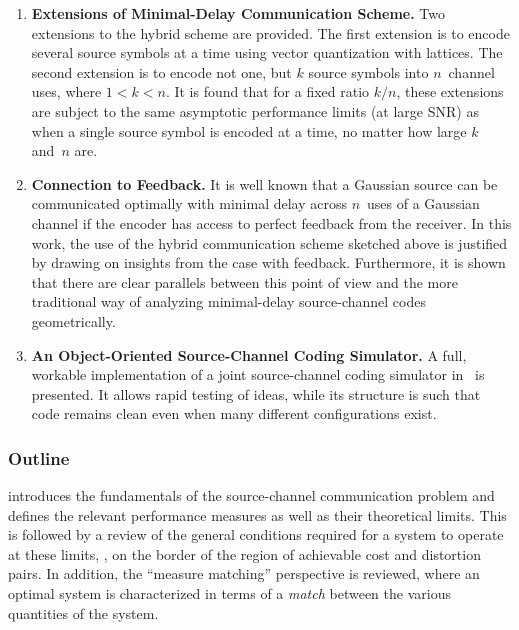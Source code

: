 \begin{enumerate}
  \item \textbf{Extensions of Minimal-Delay Communication Scheme.} Two
    extensions to the hybrid scheme are provided. The first extension is to
    encode several source symbols at a time using vector quantization with
    lattices. The second extension is to encode not one, but $k$ source symbols
    into $n$~channel uses, where $1 < k < n$. It is found that for a fixed ratio
    $k/n$, these extensions are subject to the same asymptotic performance
    limits (at large SNR) as when a single source symbol is encoded at a time,
    no matter how large $k$ and~$n$ are.

  \item \textbf{Connection to Feedback.} It is well known that a Gaussian source
    can be communicated optimally with minimal delay across $n$~uses of a
    Gaussian channel if the encoder has access to perfect feedback from the
    receiver. In this work,  the use of the hybrid communication scheme sketched
    above is justified by drawing on insights from the case with feedback.
    Furthermore, it is shown that there are clear parallels between this point
    of view and the more traditional way of analyzing minimal-delay
    source-channel codes geometrically. 

  \item \textbf{An Object-Oriented Source-Channel Coding Simulator.} A full,
    workable implementation of a joint source-channel coding simulator in
    \matlab\ is presented. It allows rapid testing of ideas, while its structure
    is such that code remains clean even when many different configurations
    exist. 

\end{enumerate}


\subsubsection{Outline}

 introduces the fundamentals of the source-channel
communication problem and defines the relevant performance measures as well as
their theoretical limits.  This is followed by a review of the general
conditions required for a system to operate at these limits, \ie, on the border
of the region of achievable cost and distortion pairs. In addition, the
``measure matching'' perspective is reviewed, where an optimal system is
characterized in terms of a  \emph{match} between the various quantities of the
system.

